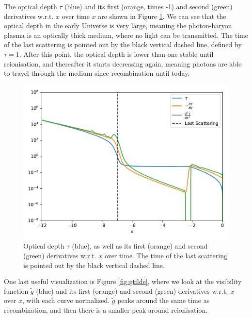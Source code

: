 \documentclass{aa}
\begin{document}
The optical depth $\tau$ (blue) and its first (orange, times -1) and second (green) derivatives w.r.t. $x$ over time $x$ are shown in Figure \ref{fig:tau}. We can see that the optical depth in the early Universe is very large, meaning the photon-baryon plasma is an optically thick medium, where no light can be transmitted. The time of the last scattering is pointed out by the black vertical dashed line, defined by $\tau=1$. After this point, the optical depth is lower than one stable until reionisation, and thereafter it starts decreasing again, meaning photons are able to travel through the medium since recombination until today.

\begin{figure}[ht]
    \centering
    \includegraphics[width=\hsize]{report/figures/tau.pdf}
    \caption{Optical depth $\tau$ (blue), as well as its first (orange) and second (green) derivatives w.r.t. $x$ over time. The time of the last scattering is pointed out by the black vertical dashed line.}
    \label{fig:tau}
\end{figure}

One last useful visualization is Figure \ref{fig:gtilde}, where we look at the visibility function $\tilde g$ (blue) and its first (orange) and second (green) derivatives w.r.t. $x$ over $x$, with each curve normalized. $\tilde g$ peaks around the same time as recombination, and then there is a smaller peak around reionisation.
\end{document}
